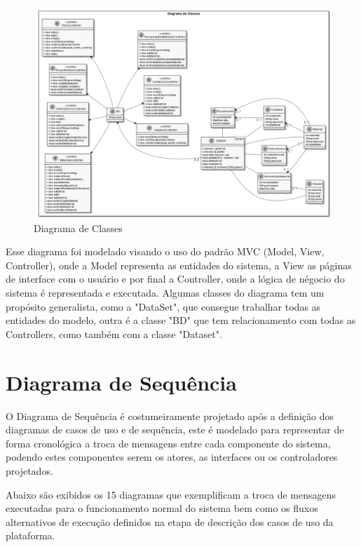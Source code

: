 \documentclass[rascunho,xindy,acronym,symbols]{fei}
\begin{document}
\begin{landscape}
    \begin{figure}
    \centering
      \includegraphics[scale=0.6, width=650pt]{./Images/Classes.png}
      \caption{Diagrama de Classes}
      \label{fig:DS_Gerente16}
      \end{figure}
\end{landscape}

Esse diagrama foi modelado visando o uso do padrão MVC (Model, View, Controller), onde a Model representa as entidades do sistema, a View as páginas de interface com o usuário e por final a Controller, onde a lógica de négocio do sistema é representada e executada. Algumas classes do diagrama tem um propósito generalista, como a "DataSet", que consegue trabalhar todas as entidades do modelo, outra é a classe "BD" que tem relacionamento com todas as Controllers, como também com a classe "Dataset".

\newpage

\section{Diagrama de Sequência} \label{diagramaSeq}

O Diagrama de Sequência é costumeiramente projetado após a definição dos diagramas de casos de uso e de sequência, este é modelado para representar de forma cronológica a troca de mensagens entre cada componente do sistema, podendo estes componentes serem os atores, as interfaces ou os controladores projetados.

Abaixo são exibidos os 15 diagramas que exemplificam a troca de mensagens executadas para o funcionamento normal do sistema bem como os fluxos alternativos de execução definidos na etapa de descrição dos casos de uso da plataforma.
\end{document}
